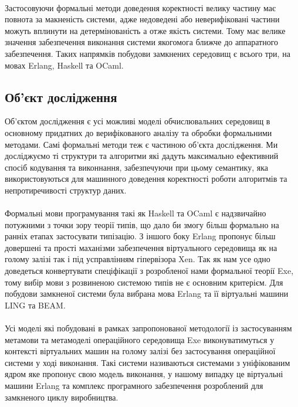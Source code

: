 \documentclass[11pt,oneside]{article}
\begin{document}
   \paragraph{}
   Застосовуючи формальні методи доведення коректності велику частину має повнота за макненість системи,
   адже недоведені або неверифіковані частини можуть вплинути на детермінованість а отже якість системи.
   Тому має велике значення забезпечення виконання системи якогомога ближче до аппаратного забезпечення.
   Таких напрямків побудови замкнених середовищ є всього три, на мовах Erlang, Haskell та OCaml.

\newpage
\subsection{Об’єкт дослідження}
\vspace{0.5cm}

   Об’єктом дослідження є усі можливі моделі обчислювальних середовищ в основному придатних
   до верифікованого аналізу та обробки формальними методами. Самі формальні методи теж є
   частиною об’єкта дослідження. Ми досліджуємо ті структури та алгоритми які дадуть
   максимально ефективний спосіб кодування та виконнання, забезпечуючи при цьому семантику,
   яка використовуються для машинного доведення коректності роботи алгоритмів та непротиречивості структур даних.

   \paragraph{}
   Формальні мови програмування такі як Haskell та OCaml є надзвичайно потужними з точки зору теорії типів,
   що дало би змогу більш формально на ранніх етапах застосувати типізацію. З іншого боку Erlang пропонує
   більш довершені та прості маханізми забезпечення віртуального середовища як на голому залізі так і
   під усправлінням гіпервізора Xen. Так як нам усе одно доведеться конвертувати спеціфікації з
   розробленої нами формальної теорії Exe, тому вибір мови з розвиненою системою типів не є основним критерієм.
   Для побудови замкненої системи була вибрана мова Erlang та її віртуальні машини LING та BEAM.

   \paragraph{}
   Усі моделі які побудовані в рамках запропонованої методології із застосуванням
   метамови та метамоделі операційного середовища Exe виконуватимуться у контексті
   віртуальних машин на голому залізі без застосування операційної системи у ході виконання.
   Такі системи називаються системами з уніфікованим ядром яке пропонує свою модель виконання,
   у нашому випадку це віртуальні машини Erlang та комплекс програмного забезпечення
   розроблений для замкненого циклу виробництва.
\end{document}
